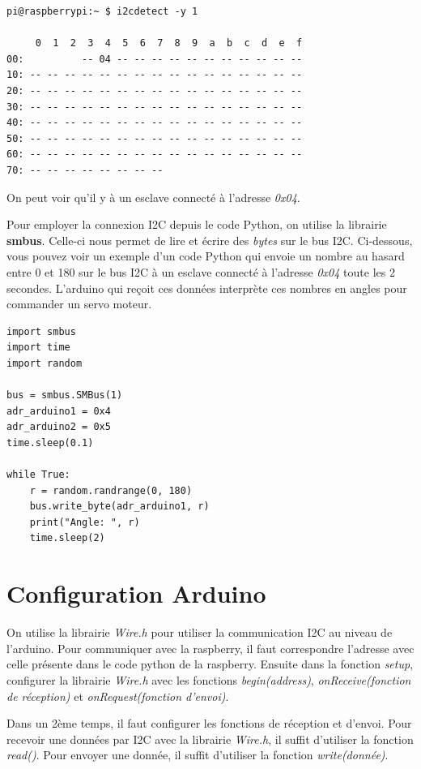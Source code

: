 \documentclass{eurobot_report}
\begin{document}
\begin{verbatim}
pi@raspberrypi:~ $ i2cdetect -y 1

     0  1  2  3  4  5  6  7  8  9  a  b  c  d  e  f
00:          -- 04 -- -- -- -- -- -- -- -- -- -- --
10: -- -- -- -- -- -- -- -- -- -- -- -- -- -- -- --
20: -- -- -- -- -- -- -- -- -- -- -- -- -- -- -- --
30: -- -- -- -- -- -- -- -- -- -- -- -- -- -- -- --
40: -- -- -- -- -- -- -- -- -- -- -- -- -- -- -- --
50: -- -- -- -- -- -- -- -- -- -- -- -- -- -- -- --
60: -- -- -- -- -- -- -- -- -- -- -- -- -- -- -- --
70: -- -- -- -- -- -- -- --
\end{verbatim}

On peut voir qu'il y à un esclave connecté à l'adresse \textit{0x04}.

Pour employer la connexion I2C depuis le code Python, on utilise la librairie \textbf{smbus}. Celle-ci nous permet de lire et écrire des \textit{bytes} sur le bus I2C. Ci-dessous, vous pouvez voir un exemple d'un code Python qui envoie un nombre au hasard entre 0 et 180 sur le bus I2C à un esclave connecté à l'adresse \textit{0x04} toute les 2 secondes. L'arduino qui reçoit ces données interprète ces nombres en angles pour commander un servo moteur.

\begin{verbatim}
import smbus
import time
import random

bus = smbus.SMBus(1)
adr_arduino1 = 0x4
adr_arduino2 = 0x5
time.sleep(0.1)

while True:
    r = random.randrange(0, 180)
    bus.write_byte(adr_arduino1, r)
    print("Angle: ", r)
    time.sleep(2)
\end{verbatim}


\section{Configuration Arduino}
On utilise la librairie \textit{Wire.h} pour utiliser la communication I2C au niveau de l'arduino. Pour communiquer avec la raspberry, il faut correspondre l'adresse avec celle présente dans le code python de la raspberry. Ensuite dans la fonction \textit{setup}, configurer la librairie \textit{Wire.h} avec les fonctions \textit{begin(address)}, \textit{onReceive(fonction de réception)} et \textit{onRequest(fonction d'envoi)}.

Dans un 2ème temps, il faut configurer les fonctions de réception et d'envoi. Pour recevoir une données par I2C avec la librairie \textit{Wire.h}, il suffit d'utiliser la fonction \textit{read()}. Pour envoyer une donnée, il suffit d'utiliser la fonction \textit{write(donnée)}.
\end{document}
